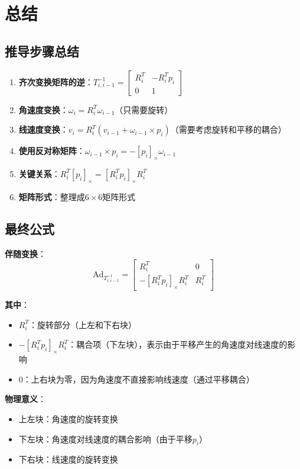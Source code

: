 \documentclass[12pt,a4paper]{article}
\begin{document}
\section{总结}

\subsection{推导步骤总结}

\begin{enumerate}
\item \textbf{齐次变换矩阵的逆}：$T_{i,i-1}^{-1} = \begin{bmatrix} R_i^T & -R_i^T p_i \\ 0 & 1 \end{bmatrix}$

\item \textbf{角速度变换}：$\omega_i = R_i^T \omega_{i-1}$（只需要旋转）

\item \textbf{线速度变换}：$v_i = R_i^T (v_{i-1} + \omega_{i-1} \times p_i)$（需要考虑旋转和平移的耦合）

\item \textbf{使用反对称矩阵}：$\omega_{i-1} \times p_i = -[p_i]_{\times} \omega_{i-1}$

\item \textbf{关键关系}：$R_i^T [p_i]_{\times} = [R_i^T p_i]_{\times} R_i^T$

\item \textbf{矩阵形式}：整理成$6 \times 6$矩阵形式
\end{enumerate}

\subsection{最终公式}

\textbf{伴随变换}：
\begin{equation}
\text{Ad}_{T_{i,i-1}^{-1}} = \begin{bmatrix}
R_i^T & 0 \\
-[R_i^T p_i]_{\times} R_i^T & R_i^T
\end{bmatrix}
\end{equation}

\textbf{其中}：
\begin{itemize}
\item $R_i^T$：旋转部分（上左和下右块）
\item $-[R_i^T p_i]_{\times} R_i^T$：耦合项（下左块），表示由于平移产生的角速度对线速度的影响
\item $0$：上右块为零，因为角速度不直接影响线速度（通过平移耦合）
\end{itemize}

\textbf{物理意义}：
\begin{itemize}
\item 上左块：角速度的旋转变换
\item 下左块：角速度对线速度的耦合影响（由于平移$p_i$）
\item 下右块：线速度的旋转变换
\end{itemize}
\end{document}
